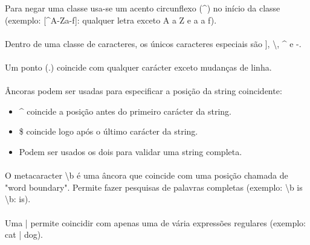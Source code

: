 \documentclass[../resumosLTW.tex]{subfiles}
\begin{document}
Para negar uma classe usa-se um acento circunflexo (\^{}) no início da classe (exemplo: [\^{}A-Za-f]: qualquer letra exceto A a Z e a a f).

\paragraph{}

Dentro de uma classe de caracteres, os únicos caracteres especiais são ], \textbackslash, \^{} e -.

\paragraph{}

Um ponto (.) coincide com qualquer carácter exceto mudanças de linha.

\paragraph{}

Âncoras podem ser usadas para especificar a posição da string coincidente:
\begin{itemize}
    \item \^{} coincide a posição antes do primeiro carácter da string.
    \item \$ coincide logo após o último carácter da string.
    \item Podem ser usados os dois para validar uma string completa.
\end{itemize}

\paragraph{}

O metacaracter \textbackslash b é uma âncora que coincide com uma posição chamada de "word boundary".
Permite fazer pesquisas de palavras completas (exemplo: \textbackslash b is \textbackslash b: is).

\paragraph{}

Uma | permite coincidir com apenas uma de vária expressões regulares (exemplo: cat | dog).

\paragraph{}
\end{document}
